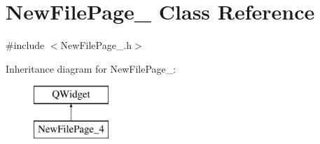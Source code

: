 \hypertarget{class_new_file_page__4}{\section{New\-File\-Page\-\_ Class Reference}
\label{class_new_file_page__4}
}


{\ttfamily \#include $<$New\-File\-Page\-\_.\-h$>$}

Inheritance diagram for New\-File\-Page\-\_\-:\begin{figure}[H]
\begin{center}
\leavevmode
\includegraphics[height=2.000000cm]{class_new_file_page__4}
\end{center}
\end{figure}
